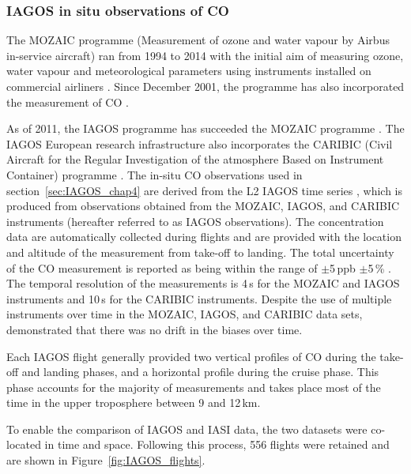 \documentclass[acp, manuscript]{copernicus}
\begin{document}
\subsubsection{IAGOS in situ observations of CO}\label{sec:descrip_IAGOS}


The MOZAIC programme (Measurement of ozone and water vapour by Airbus in-service aircraft) ran from 1994 to 2014 with the initial aim of measuring ozone, water vapour and meteorological parameters using instruments installed on commercial airliners \citep{marencoMeasurementOzoneWater1998}. Since December 2001, the programme has also incorporated the measurement of CO \citep{nedelecImprovedInfraredCarbon2003}.


As of 2011, the IAGOS programme has succeeded the MOZAIC programme \citep{petzoldGlobalscaleAtmosphereMonitoring2015,thouretIAGOSMonitoringAtmospheric2022}. The IAGOS European research infrastructure also incorporates the CARIBIC (Civil Aircraft for the Regular Investigation of the atmosphere Based on Instrument Container) programme \citep{brenninkmeijerCARIBICCivilAircraft1999}.
The in-situ CO observations used in section~\ref{sec:IAGOS_chap4} are derived from the L2 IAGOS time series \citep{boulangerIAGOSFinalQuality2018}, which is produced from observations obtained from the MOZAIC, IAGOS, and CARIBIC instruments (hereafter referred to as IAGOS observations). The concentration data are automatically collected during flights and are provided with the location and altitude of the measurement from take-off to landing. The total uncertainty of the CO measurement is reported as being within the range of $\pm$5\,ppb $\pm$5\,\% \citep{nedelecInstrumentationCommercialAircraft2015}. The temporal resolution of the measurements is 4\,s for the MOZAIC and IAGOS instruments and 10\,s for the CARIBIC instruments.
Despite the use of multiple instruments over time in the MOZAIC, IAGOS, and CARIBIC data sets, \citet{blotInternalConsistencyIAGOS2021} demonstrated that there was no drift in the biases over time.

Each IAGOS flight generally provided two vertical profiles of CO during the take-off and landing phases, and a horizontal profile during the cruise phase. This phase accounts for the majority of measurements and takes place most of the time in the upper troposphere between 9 and 12\,km. 

To enable the comparison of IAGOS and IASI data, the two datasets were co-located in time and space. Following this process, 556 flights were retained and are shown in Figure~\ref{fig:IAGOS_flights}. 
\end{document}
